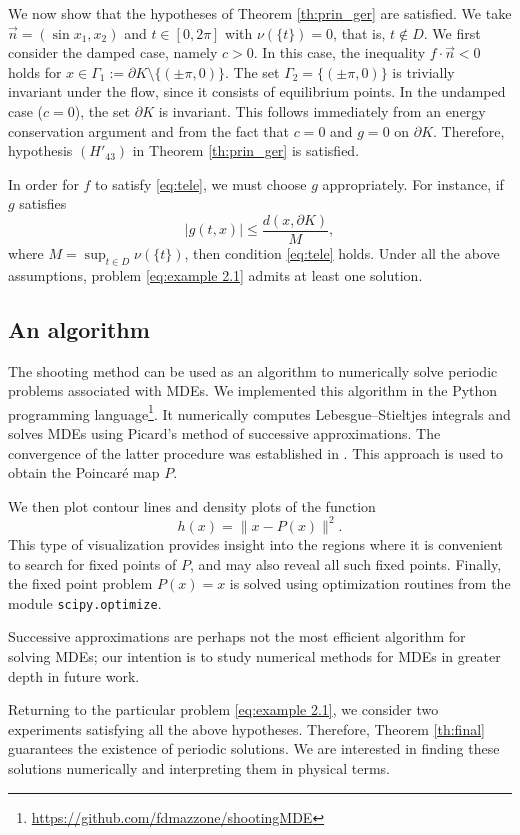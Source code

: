 \documentclass[a4paper,11pt]{amsart}
\theoremstyle{plain}
\theoremstyle{remark}
\numberwithin{equation}{section}
\begin{document}
We now show that the hypotheses of Theorem \ref{th:prin_ger} are satisfied. We take $\vec{n}=(\sin x_1,x_2)$ and $t\in [0,2\pi]$ with $\nu(\{t\})=0$, that is, $t\notin D$. We first consider the damped case, namely $c>0$. In this case, the inequality $f\cdot \vec{n}<0$ holds for $x \in \Gamma_1:=\partial K\setminus\{ (\pm\pi,0) \}$. The set $\Gamma_2= \{ (\pm\pi,0) \}$ is trivially invariant under the flow, since it consists of equilibrium points. In the undamped case ($c=0$), the set $\partial K$ is invariant. This follows immediately from an energy conservation argument and from the fact that $c=0$ and $g=0$ on $\partial K$. Therefore, hypothesis $(H'_{43})$ in Theorem \ref{th:prin_ger} is satisfied.

In order for $f$ to satisfy \ref{eq:tele}, we must choose $g$ appropriately. For instance, if $g$ satisfies
$$|g(t,x)|\leq \frac{d(x,\partial K)}{M},$$
where $M=\displaystyle\sup_{t\in D}\nu(\{t\})$, then condition \ref{eq:tele} holds. Under all the above assumptions, problem \eqref{eq:example 2.1} admits at least one solution.

\subsection{An algorithm}

The shooting method can be used as an algorithm to numerically solve periodic problems associated with MDEs. We implemented this algorithm in the Python programming language\footnote{\href{https://github.com/fdmazzone/shootingMDE}{https://github.com/fdmazzone/shootingMDE}}. It numerically computes Lebesgue--Stieltjes integrals and solves MDEs using Picard's method of successive approximations. The convergence of the latter procedure was established in \cite{P.Mazzone}. This approach is used to obtain the Poincaré map $P$.

We then plot contour lines and density plots of the function
\[
h(x)=\|x-P(x)\|^2.
\]
This type of visualization provides insight into the regions where it is convenient to search for fixed points of $P$, and may also reveal all such fixed points. Finally, the fixed point problem $P(x)=x$ is solved using optimization routines from the module \texttt{scipy.optimize}.

Successive approximations are perhaps not the most efficient algorithm for solving MDEs; our intention is to study numerical methods for MDEs in greater depth in future work.

Returning to the particular problem \eqref{eq:example 2.1}, we consider two experiments satisfying all the above hypotheses. Therefore, Theorem \ref{th:final} guarantees the existence of periodic solutions. We are interested in finding these solutions numerically and interpreting them in physical terms.
\end{document}
